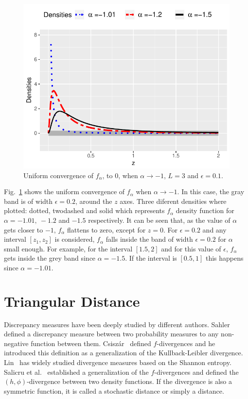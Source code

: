 \documentclass[technote,onecolumn,draftcls,12pt]{IEEEtran}
\numberwithin{equation}{section}
\begin{document}
\begin{figure}[hbt]
	\centering    
	\includegraphics[width=\linewidth]{../../../Figures/DTTeorico/ConvUnifEnCero.pdf}
	\caption{\label{ConvEnCero}Uniform convergence of $f_{\alpha}$, to $0$, when $\alpha \to -1$, $L=3$ and $\epsilon=0.1$.}
\end{figure}

Fig.~\ref{ConvEnCero} shows the uniform convergence of $f_{\alpha}$ when $\alpha \to -1$. In this case, the gray band is of width $\epsilon=0.2$, around the $z$ axes. Three diferent densities where plotted: dotted, twodashed and solid which represents $f_{\alpha}$ density function for $\alpha=-1.01, \ -1.2$ and $-1.5$ respectively. It can be seen that, as the value of $\alpha$ gets closer to $-1$, $f_{\alpha}$ flattens to zero, except for $z=0$. For  $\epsilon=0.2$ and any interval $[z_1,z_2]$ is considered, $f_{\alpha}$ falls inside the band of width $\epsilon=0.2$ for $\alpha$ small enough. For example, for the interval $[1.5,2]$ and for this value of $\epsilon$, $f_{\alpha}$ gets inside the grey band since $\alpha=-1.5$. If the interval is $[0.5,1]$ this happens since $\alpha=-1.01$.
\section{Triangular Distance}
\label{DTsection}

Discrepancy measures have been deeply studied by different authors. Sahler~\cite{Sahler1970} defined a discrepancy measure between two probability measures to any non-negative
function between them. Csisz\'ar~\cite{Csiszar1967} defined $f$-divergences and he introduced this definition as a generalization of the Kullback-Leibler divergence. Lin~\cite{Lin1991} has widely studied divergence measures based on the Shannon entropy.  Salicru et al.~\cite{Salicru1994} established a generalization of the $f$-divergences and defined the $(h,\phi)$-divergence between two density functions. If the divergence is also a symmetric function, it is called a stochastic distance or simply a distance.
\end{document}
